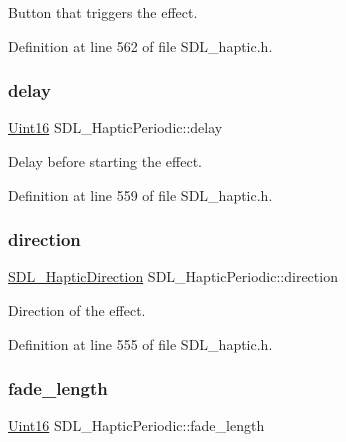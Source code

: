 Button that triggers the effect. 

Definition at line 562 of file S\+D\+L\+\_\+haptic.\+h.

\mbox{\label{struct_s_d_l___haptic_periodic_a8688d1c7ee6270ed290f6b474aef5ec9}} 
\subsubsection{\texorpdfstring{delay}{delay}}
{\footnotesize\ttfamily \mbox{\hyperlink{_s_d_l__stdinc_8h_a31fcc0a076c9068668173ee26d33e42b}{Uint16}} S\+D\+L\+\_\+\+Haptic\+Periodic\+::delay}

Delay before starting the effect. 

Definition at line 559 of file S\+D\+L\+\_\+haptic.\+h.

\mbox{\label{struct_s_d_l___haptic_periodic_a2c4f27d4583187a7a994e79ad49083d3}} 
\subsubsection{\texorpdfstring{direction}{direction}}
{\footnotesize\ttfamily \mbox{\hyperlink{struct_s_d_l___haptic_direction}{S\+D\+L\+\_\+\+Haptic\+Direction}} S\+D\+L\+\_\+\+Haptic\+Periodic\+::direction}

Direction of the effect. 

Definition at line 555 of file S\+D\+L\+\_\+haptic.\+h.

\mbox{\label{struct_s_d_l___haptic_periodic_ae1c186d02304eae142a62dca72f50fa8}} 
\subsubsection{\texorpdfstring{fade\_length}{fade\_length}}
{\footnotesize\ttfamily \mbox{\hyperlink{_s_d_l__stdinc_8h_a31fcc0a076c9068668173ee26d33e42b}{Uint16}} S\+D\+L\+\_\+\+Haptic\+Periodic\+::fade\+\_\+length}

